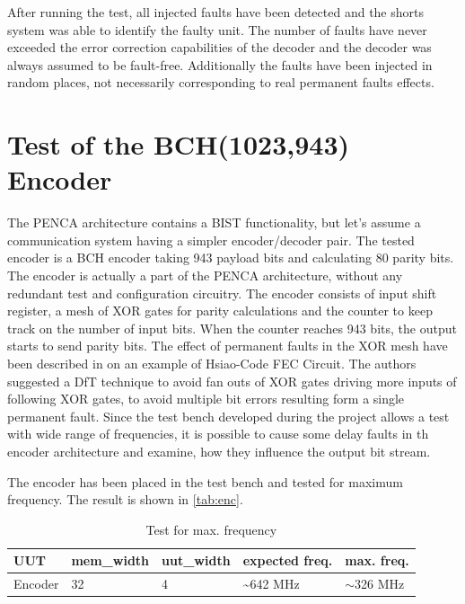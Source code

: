After running the test, all injected faults have been detected and the shorts system was able to identify the faulty unit. The number of faults have never exceeded the error correction capabilities of the decoder and the decoder was always assumed to be fault-free. Additionally the faults have been injected in random places, not necessarily corresponding to real permanent faults effects.

\section{Test of the BCH(1023,943) Encoder}
The PENCA architecture contains a BIST functionality, but let's assume a communication system having a simpler encoder/decoder pair. The tested encoder is a BCH encoder taking 943 payload bits and calculating 80 parity bits. The encoder is actually a part of the PENCA architecture, without any redundant test and configuration circuitry. The encoder consists of input shift register, a mesh of XOR gates for parity calculations and the counter to keep track on the number of input bits. When the counter reaches 943 bits, the output starts to send parity bits. The effect of permanent faults in the XOR mesh have been described in \cite{art:Dicorato} on an example of Hsiao-Code FEC Circuit. The authors suggested a DfT technique to avoid fan outs of XOR gates driving more inputs of following XOR gates, to avoid multiple bit errors resulting form a single permanent fault. Since the test bench developed during the project allows a test with wide range of frequencies, it is possible to cause some delay faults in th encoder architecture and examine, how they influence the output bit stream. 

The encoder has been placed in the test bench and tested for maximum frequency. The result is shown in \autoref{tab:enc}.

\begin{table}[]
\begin{tabular}{@{}lllll@{}}
\toprule
UUT                       &mem\_width   &uut\_width &expected freq. &max. freq.\\ 
\midrule
Encoder                   & 32          & 4      & \sim642 MHz & $\sim$326 MHz \\ 
\bottomrule
\end{tabular}
\centering
\caption{Test for max. frequency}\label{tab:enc}
\end{table}

